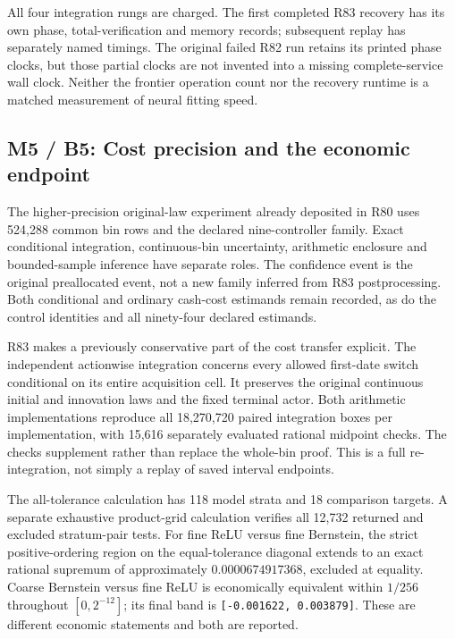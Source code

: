 All four integration rungs are charged. The first completed R83 recovery
has its own phase, total-verification and memory records; subsequent
replay has separately named timings. The original failed R82 run retains
its printed phase clocks, but those partial clocks are not invented into
a missing complete-service wall clock. Neither the frontier operation
count nor the recovery runtime is a matched measurement of neural
fitting speed.

\hypertarget{m5-b5-cost-precision-and-the-economic-endpoint}{%
\subsection{M5 / B5: Cost precision and the economic
endpoint}\label{m5-b5-cost-precision-and-the-economic-endpoint}}

The higher-precision original-law experiment already deposited in R80
uses 524,288 common bin rows and the declared nine-controller family.
Exact conditional integration, continuous-bin uncertainty, arithmetic
enclosure and bounded-sample inference have separate roles. The
confidence event is the original preallocated event, not a new family
inferred from R83 postprocessing. Both conditional and ordinary
cash-cost estimands remain recorded, as do the control identities and
all ninety-four declared estimands.

R83 makes a previously conservative part of the cost transfer explicit.
The independent actionwise integration concerns every allowed first-date
switch conditional on its entire acquisition cell. It preserves the
original continuous initial and innovation laws and the fixed terminal
actor. Both arithmetic implementations reproduce all 18,270,720 paired
integration boxes per implementation, with 15,616 separately evaluated
rational midpoint checks. The checks supplement rather than replace the
whole-bin proof. This is a full re-integration, not simply a replay of
saved interval endpoints.

The all-tolerance calculation has 118 model strata and 18 comparison
targets. A separate exhaustive product-grid calculation verifies all
12,732 returned and excluded stratum-pair tests. For fine ReLU versus
fine Bernstein, the strict positive-ordering region on the
equal-tolerance diagonal extends to an exact rational supremum of
approximately \(0.0000674917368\), excluded at equality. Coarse
Bernstein versus fine ReLU is economically equivalent within \(1/256\)
throughout \([0,2^{-12}]\); its final band is
\texttt{{[}-0.001622,\ 0.003879{]}}. These are different economic
statements and both are reported.

